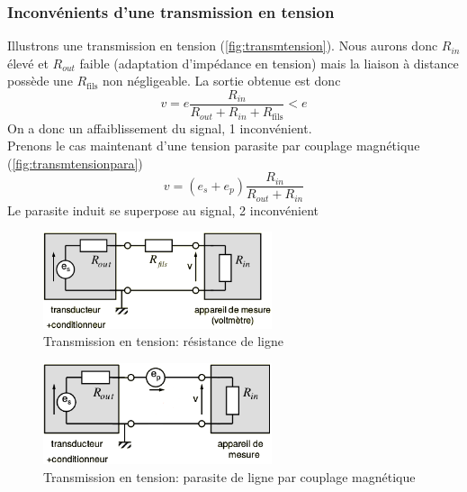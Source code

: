 \subsubsection{Inconvénients d'une transmission en tension}
Illustrons une transmission en tension (\autoref{fig:transmtension}). Nous aurons donc \(R_{in}\) élevé et \(R_{out}\) faible (adaptation d'impédance en tension) mais la liaison à distance possède une \(R_{\text{fils}}\) non négligeable. La sortie obtenue est donc 
\[v = e\frac{R_{in}}{R_{out}+R_{in}+R_{\text{fils}}}<e\]
On a donc un affaiblissement du signal, 1 inconvénient.\\
Prenons le cas maintenant d'une tension parasite par couplage magnétique (\autoref{fig:transmtensionpara})
\[v = (e_s+e_p)\frac{R_{in}}{R_{out}+R_{in}}\]
Le parasite induit se superpose au signal, 2 inconvénient
\begin{figure}[H] 
	\centering 
	\includegraphics[width=0.6\textwidth,height=10\baselineskip,keepaspectratio]{ch3/image23} 
	\caption{Transmission en tension: résistance de ligne} 
	\label{fig:transmtension}
\end{figure}
\begin{figure}[H] 
	\centering 
	\includegraphics[width=0.6\textwidth,height=10\baselineskip,keepaspectratio]{ch3/image24} 
	\caption{Transmission en tension: parasite de ligne par couplage magnétique} 
	\label{fig:transmtensionpara}
\end{figure}
